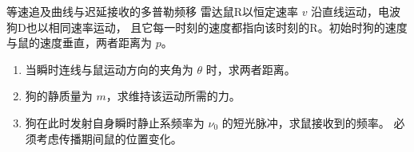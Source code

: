 \begin{advexamplebox}{等速追及曲线与迟延接收的多普勒频移}\label{advA6:ex:pursuit-doppler}
雷达鼠R以恒定速率 $v$ 沿直线运动，电波狗D也以相同速率运动，
且它每一时刻的速度都指向该时刻的R。初始时狗的速度与鼠的速度垂直，两者距离为 $p$。
\begin{enumerate}
\item 当瞬时连线与鼠运动方向的夹角为 $\theta$ 时，求两者距离。
\item 狗的静质量为 $m$，求维持该运动所需的力。
\item 狗在此时发射自身瞬时静止系频率为 $\nu_0$ 的短光脉冲，求鼠接收到的频率。
必须考虑传播期间鼠的位置变化。
\end{enumerate}
\begin{center}

\label{advA6:quality:A6-source-exercises:q7}

\end{center}
\end{advexamplebox}
